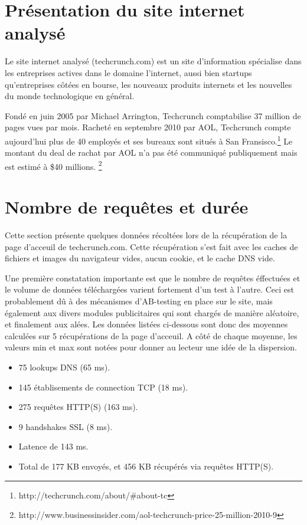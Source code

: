 \documentclass[a4paper,11pt,final]{article}
\begin{document}
  
  \cleardoublepage

  \section{Présentation du site internet analysé}

  Le site internet analysé (techcrunch.com) est un site d'information spécialise dans les entreprises actives dans le domaine l'internet, aussi bien startups qu'entreprises côtées en bourse, les nouveaux produits internets et les nouvelles du monde technologique en général.

  Fondé en juin 2005 par Michael Arrington, Techcrunch comptabilise 37 million de pages vues par mois. Racheté en septembre 2010 par AOL, Techcrunch compte aujourd'hui plus de 40 employés et ses bureaux sont situés à San Fransisco.\footnote{http://techcrunch.com/about/\#about-tc} Le montant du deal de rachat par AOL n'a pas été communiqué publiquement mais est estimé à \$40 millions. \footnote{http://www.businessinsider.com/aol-techcrunch-price-25-million-2010-9}

  \section{Nombre de requêtes et durée}

  Cette section présente quelques données récoltées lors de la récupération de la page d'acceuil de techcrunch.com. Cette récupération s'est fait avec les caches de fichiers et images du navigateur vides, aucun cookie, et le cache DNS vide. 

  Une première constatation importante est que le nombre de requêtes éffectuées et le volume de données téléchargées varient fortement d'un test à l'autre. Ceci est probablement dû à des mécanismes d'AB-testing en place sur le site, mais également aux divers modules publicitaires qui sont chargés de manière aléatoire, et finalement aux alées. Les données listées ci-dessous sont donc des moyennes calculées sur 5 récupérations de la page d'acceuil. A côté de chaque moyenne, les valeurs min et max sont notées pour donner au lecteur une idée de la dispersion.

  \begin{itemize}
    \item 75 lookups DNS (65 ms).
    \item 145 établisements de connection TCP (18 ms).
    \item 275 requêtes HTTP(S) (163 ms).
    \item 9 handshakes SSL (8 ms).
    \item Latence de 143 ms.
    \item Total de 177 KB envoyés, et 456 KB récupérés via requêtes HTTP(S).
  \end{itemize}
\end{document}
